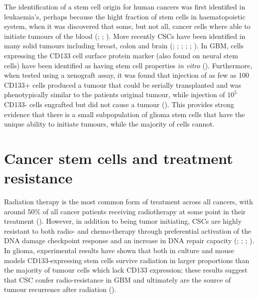 \documentclass[
  letterpaper,
]{scrreprt}
\theoremstyle{definition}
\theoremstyle{remark}
\begin{document}
The identification of a stem cell origin for human cancers was first
identified in leukaemia's, perhaps because the hight fraction of stem
cells in haematopoietic system, when it was discovered that some, but
not all, cancer cells where able to initiate tumours of the blood
(;
;
). More recently CSCs
have been identified in many solid tumours including breast, colon and
brain (;
;
;
;
;
). In GBM, cells expressing
the CD133 cell surface protein marker (also found on neural stem cells)
have been identified as having stem cell properties \emph{in vitro}
(). Furthermore, when tested
using a xenograft assay, it was found that injection of as few as 100
CD133+ cells produced a tumour that could be serially transplanted and
was phenotypically similar to the patients original tumour, while
injection of \(10^5\) CD133- cells engrafted but did not cause a tumour
(). This provides strong
evidence that there is a small subpopulation of glioma stem cells that
have the unique ability to initiate tumours, while the majority of cells
cannot.

\section{Cancer stem cells and treatment
resistance}\label{sec-cancer-stem-cells-and-treatment-resistance}

Radiation therapy is the most common form of treatment across all
cancers, with around 50\% of all cancer patients receiving radiotherapy
at some point in their treatment (). However, in addition to being tumor initiating, CSCs are
highly resistant to both radio- and chemo-therapy through preferential
activation of the DNA damage checkpoint response and an increase in DNA
repair capacity (;
; ; ). In glioma,
experimental results have shown that both in culture and mouse models
CD133-expressing stem cells survive radiation in larger proportions than
the majority of tumour cells which lack CD133 expression; these results
suggest that CSC confer radio-resistance in GBM and ultimately are the
source of tumour recurrence after radiation ().
\end{document}
